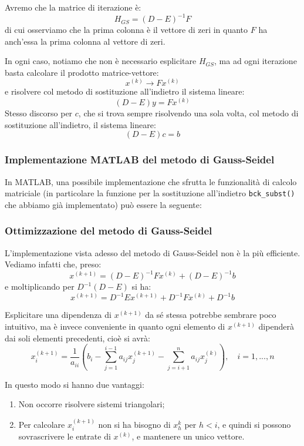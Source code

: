 \documentclass[a4paper,11pt]{article}
\begin{document}
Avremo che la matrice di iterazione è:
$$
H_{GS} = (D - E)^{-1} F
$$
di cui osserviamo che la prima colonna è il vettore di zeri in quanto $F$ ha anch'essa la prima colonna al vettore di zeri.

In ogni caso, notiamo che non è necessario esplicitare $H_{GS}$, ma ad ogni iterazione basta calcolare il prodotto matrice-vettore:
$$
x^{(k)} \rightarrow F x^{(k)}
$$
e risolvere col metodo di sostituzione all'indietro il sistema lineare: 
$$
(D - E) y = F x^{(k)}
$$
Stesso discorso per $c$, che si trova sempre risolvendo una sola volta, col metodo di sostituzione all'indietro, il sistema lineare:
$$
(D - E) c = b
$$

\subsubsection{Implementazione MATLAB del metodo di Gauss-Seidel}
In MATLAB, una possibile implementazione che sfrutta le funzionalità di calcolo matriciale (in particolare la funzione per la sostituzione all'indietro \lstinline|bck_subst()| che abbiamo già implementato) può essere la seguente:

\lstset{style=codestyle, language=MATLAB}


\subsubsection{Ottimizzazione del metodo di Gauss-Seidel}
L'implementazione vista adesso del metodo di Gauss-Seidel non è la più efficiente. 
Vediamo infatti che, preso:
$$
x^{(k + 1)} = (D - E)^{-1} F x^{(k)} + (D - E)^{-1} b
$$
e moltiplicando per $D^{-1}(D - E)$ si ha:
$$
x^{(k + 1)} = D^{-1} E x^{(k + 1)} + D^{-1} F x^{(k)} + D^{-1} b
$$

Esplicitare una dipendenza di $x^{(k + 1)}$ da sé stessa potrebbe sembrare poco intuitivo,
ma è invece conveniente in quanto ogni elemento di $x^{(k + 1)}$ dipenderà dai soli elementi precedenti, cioè si avrà:
$$
x_i^{(k + 1)} = \frac{1}{a_{ii}} \left( b_i - \sum_{j = 1}^{i - 1} a_{ij} x_j^{(k + 1)} - \sum_{j = i + 1}^n a_{ij} x_j^{(k)} \right), \quad i = 1, ..., n
$$

In questo modo si hanno due vantaggi:
\begin{enumerate}
	\item Non occorre risolvere sistemi triangolari;
	\item Per calcolare $x_i^{(k + 1)}$ non si ha bisogno di $x_h^{k}$ per $h < i$, e quindi si possono sovrascrivere le entrate di $x^{(k)}$, e mantenere un unico vettore.
\end{enumerate}
\end{document}
